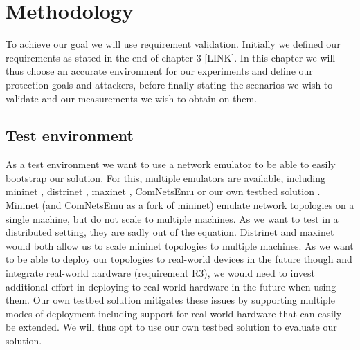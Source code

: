 \documentclass{article}
\begin{document}
\section{Methodology}
\iffalse
\begin{itemize}
    \item Requirement validation as base methodology
    \item Test environment (Discussion Mininet vs Distrinet vs our solution)
    \item Protection goals (including metrics like bandwidth and latency)
    \begin{itemize}
        \item Questions that can be validated in chapter “Validation” => Protection goal list
    \end{itemize}
    \item Attackers
    \item Deployments
    \begin{itemize}
        \item Full local deployment
        \item Minimal distributed deployment (2 Hosts, 1 real-world SDN Switch)
    \end{itemize}
\end{itemize}
\fi
To achieve our goal we will use requirement validation. Initially we defined our requirements as stated in the end of chapter 3 [LINK]. In this chapter we will thus choose an accurate environment for our experiments and define our protection goals and attackers, before finally stating the scenarios we wish to validate and our measurements we wish to obtain on them.

\subsection{Test environment}
As a test environment we want to use a network emulator to be able to easily bootstrap our solution. For this, multiple emulators are available, including mininet \cite{mininet}, distrinet \cite{distrinet1, distrinet2}, maxinet \cite{maxinet}, ComNetsEmu \cite{comnetsemu} or our own testbed solution \cite{owntb}.
Mininet (and ComNetsEmu as a fork of mininet) emulate network topologies on a single machine, but do not scale to multiple machines. As we want to test in a distributed setting, they are sadly out of the equation. Distrinet and maxinet would both allow us to scale mininet topologies to multiple machines. As we want to be able to deploy our topologies to real-world devices in the future though and integrate real-world hardware (requirement R3), we would need to invest additional effort in deploying to real-world hardware in the future when using them. Our own testbed solution mitigates these issues by supporting multiple modes of deployment including support for real-world hardware that can easily be extended. We will thus opt to use our own testbed solution to evaluate our solution.
\end{document}
